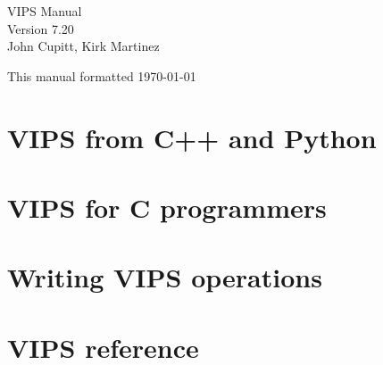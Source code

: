 \documentclass[a4paper,twocolumn,dvips]{book}
\begin{document}

\begin{titlepage}
\thispagestyle{empty}
\begin{center}
\huge
VIPS Manual\\
\large Version 7.20\\
\vspace{0.5in}
\large
John Cupitt,
Kirk Martinez\\
\end{center}

\vspace{6in}

This manual formatted \today
\setcounter{page}{1}
\end{titlepage}

\tableofcontents
\thispagestyle{plain}

\listoffigures
\thispagestyle{plain}

\listoftables
\thispagestyle{plain}

{}
\thispagestyle{plain}
\cfoot{}

\chapter{VIPS from C++ and Python}








\chapter{VIPS for C programmers}








\chapter{Writing VIPS operations}






\chapter{VIPS reference}



\end{document}

